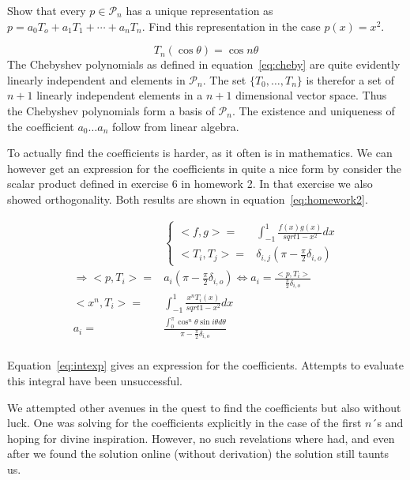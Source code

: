 \begin{problem}
  Show that every $p \in \mathcal{P}_n$ has a unique representation as
  $p = a_0 T_o + a_1 T_1 + \cdots + a_n T_n$. Find this representation
  in the case $p(x) = x^2$.
\end{problem}

\begin{solution}
  \begin{equation}
    \label{eq:cheby} T_n(\cos{\theta}) = \cos{n\theta}
  \end{equation} The Chebyshev polynomials as defined in
  equation~\ref{eq:cheby} are quite evidently linearly independent and
  elements in $\mathcal{P}_n$. The set $\{ T_0, \dots , T_n\}$ is
  therefor a set of $n+1$ linearly independent elements in a $n+1$
  dimensional vector space. Thus the Chebyshev polynomials form a basis
  of $\mathcal{P}_n$. The existence and uniqueness of the
  coefficient $a_0 \dots a_n$ follow from linear algebra.
  
  To actually find the coefficients is harder, as it often is in
  mathematics. We can however get an expression for the coefficients in
  quite a nice form by consider the scalar product defined in exercise 6
  in homework 2. In that exercise we also showed orthogonality. Both
  results are shown in equation~\ref{eq:homework2}.

  \begin{align}
    \label{eq:homework2}
    & \begin{cases}
      <f, g> = & \int_{-1}^{1} \frac{f(x) g(x)}{sqrt{1 - x^2}} dx \\
      <T_i, T_j> = & \delta_{i,j} ( \pi - \frac{\pi}{2}\delta_{i,o} )
    \end{cases} \\
    \nonumber
    \Rightarrow <p, T_i> =  & a_i ( \pi - \frac{\pi}{2}\delta_{i,o} ) 
                              \Leftrightarrow a_i =
                              \frac{<p,T_i>}{\frac{\pi}{2}\delta_{i,o}} \\
    \nonumber 
    <x^n, T_i>  = & \int_{-1}^{1} \frac{x^n T_i(x)}{sqrt{1 - x^2}} dx
    \\
    \label{eq:intexp} 
    a_i = & \frac{\int_0^\pi \cos^{n}\theta \sin{i\theta} d\theta}{\pi
            - \frac{\pi}{2}\delta_{i,o}} \\
  \end{align}

Equation~\ref{eq:intexp} gives an expression for the
coefficients. Attempts to evaluate this integral have been
unsuccessful.

We attempted other avenues in the quest to find the coefficients but
also without luck. One was solving for the coefficients explicitly in
the case of the first $n$´s and hoping for divine inspiration.
However, no such revelations where had, and even after we found the
solution online (without derivation) the solution still taunts us.
\end{solution}

